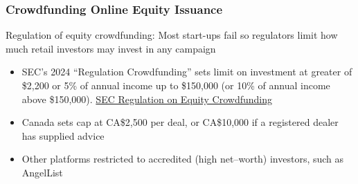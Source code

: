 \documentclass[aspectratio=169,xcolor=dvipsnames]{beamer}
\begin{document}
\begin{frame}
\frametitle{Crowdfunding Online Equity Issuance}


Regulation of equity crowdfunding: Most start-ups fail so regulators limit how much retail investors may invest in any campaign
\begin{itemize}
    \item SEC's 2024 ``Regulation Crowdfunding'' sets limit on investment at greater of \$2,200 or 5\% of annual income up to \$150,000 (or 10\% of annual income above \$150,000). \href{https://www.sec.gov/education/smallbusiness/exemptofferings/regcrowdfunding}{SEC Regulation on Equity Crowdfunding}
    \item Canada sets cap at CA\$2,500 per deal, or CA\$10,000 if a registered dealer has supplied advice
    \item Other platforms restricted to accredited (high net–worth) investors, such as AngelList
\end{itemize}


\end{frame} 












\end{document}
